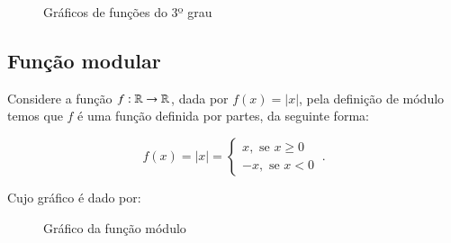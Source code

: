 \begin{itemize}
  \begin{figure}[H]
   \caption{Gráficos de funções do 3º grau}
  \end{figure}
 
 \end{itemize}
 

  \subsection{Função modular}
  
  Considere a função $f: \mathbb{R} \rightarrow \mathbb{R}$, dada por $f(x)= |x|$, pela definição de módulo temos que $f$ é uma função definida por partes, da seguinte forma:

  \[f(x)= |x| = \begin{cases}
                 x, \text{ se } x \geq 0 \\
                 -x, \text{ se } x < 0
                \end{cases} \ .\]
 
 Cujo gráfico é dado por:
                
  \begin{figure}[H]
 \centering
    \caption{Gráfico da função módulo}
  \end{figure}
  
